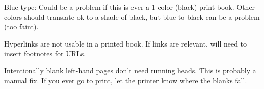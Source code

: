 Blue type: Could be a problem if this is ever a 1-color (black) print book. Other colors should translate ok to a shade of black, but blue to black can be a problem (too faint).

Hyperlinks are not usable in a printed book. If links are relevant, will need to insert footnotes for URLs. 


Intentionally blank left-hand pages don’t need running heads. This is probably a manual fix. If you ever go to print, let the printer know where the blanks fall.